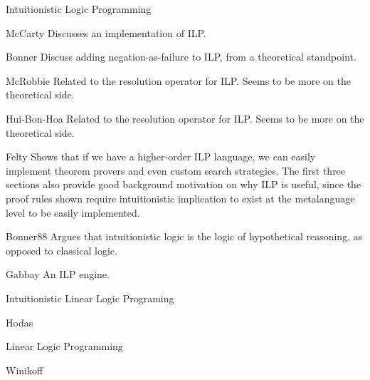 \begin{pgroup}{Intuitionistic Logic Programming}
  \begin{paper}{McCarty}
    Discusses an implementation of ILP.
    \mustread
  \end{paper}

  \begin{paper}{Bonner}
    Discuss adding negation-as-failure to ILP, from a theoretical standpoint.
    \mustread
  \end{paper}

  \begin{paper}{McRobbie}
    Related to the resolution operator for ILP.
    Seems to be more on the theoretical side.
    \mustread
  \end{paper}

  \begin{paper}{Hui-Bon-Hoa}
    Related to the resolution operator for ILP.
    Seems to be more on the theoretical side.
    \mustread
  \end{paper}

  \begin{paper}{Felty}
    Shows that if we have a higher-order ILP language, we can easily implement theorem provers and even custom search strategies.
    The first three sections also provide good background motivation on why ILP is useful, since the proof rules shown require intuitionistic implication to exist at the metalanguage level to be easily implemented.
    \mustread
  \end{paper}

  \begin{paper}{Bonner88}
    Argues that intuitionistic logic is the logic of hypothetical reasoning, as opposed to classical logic.
    \mustread
  \end{paper}

  \begin{paper}{Gabbay}
    An ILP engine.
    \mustread
  \end{paper}
\end{pgroup}

\begin{pgroup}{Intuitionistic Linear Logic Programing}
  \begin{paper}{Hodas}
    \mustread
  \end{paper}
\end{pgroup}

\begin{pgroup}{Linear Logic Programming}
  \begin{paper}{Winikoff}
    \mustread
  \end{paper}
\end{pgroup}
